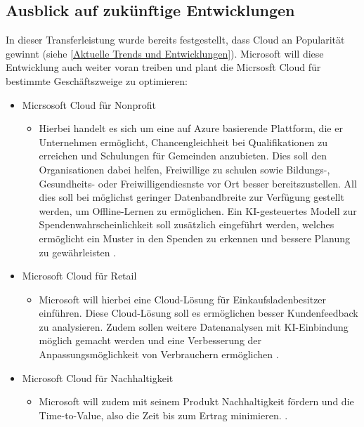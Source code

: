 \documentclass[12pt,bibtotoc]{article}
\begin{document}
		\subsection{Ausblick auf zukünftige Entwicklungen}
		In dieser Transferleistung wurde bereits festgestellt, dass Cloud an Popularität gewinnt (siehe \ref{Aktuelle Trends und Entwicklungen}).
		Microsoft will diese Entwicklung auch weiter voran treiben und plant die Micrsosft Cloud für bestimmte Geschäftszweige zu optimieren:
		\begin{itemize}
			\item Micrsosoft Cloud für Nonprofit
			\begin{itemize}
				\item Hierbei handelt es sich um eine auf Azure basierende Plattform, die er Unternehmen ermöglicht, Chancengleichheit bei Qualifikationen zu erreichen und Schulungen für Gemeinden anzubieten.
						Dies soll den Organisationen dabei helfen, Freiwillige zu schulen sowie Bildungs-, Gesundheits- oder Freiwilligendiesnste vor Ort besser bereitszustellen.
						All dies soll bei möglichst geringer Datenbandbreite zur Verfügung gestellt werden, um Offline-Lernen zu ermöglichen.
						Ein KI-gesteuertes Modell zur Spendenwahrscheinlichkeit soll zusätzlich eingeführt werden, welches ermöglicht ein Muster in den Spenden zu erkennen und bessere Planung zu gewährleisten \cite{Microsoft-Release-Plan-2024-Wave-1.2024}. 
			\end{itemize}
			\item Microsoft Cloud für Retail
				\begin{itemize}
					\item Microsoft will hierbei eine Cloud-Lösung für Einkaufsladenbesitzer einführen. Diese Cloud-Lösung soll es ermöglichen besser Kundenfeedback
							zu analysieren. Zudem sollen weitere Datenanalysen mit KI-Einbindung möglich gemacht werden und eine Verbesserung der Anpassungsmöglichkeit von Verbrauchern ermöglichen \cite{Microsoft-Release-Plan-2024-Wave-1.2024}.
				\end{itemize}
			\item Microsoft Cloud für Nachhaltigkeit
				\begin{itemize}
					\item Microsoft will zudem mit seinem Produkt Nachhaltigkeit fördern und die Time-to-Value, also die Zeit bis zum Ertrag minimieren. \cite{Microsoft-Release-Plan-2024-Wave-1.2024}.
				\end{itemize}
		\end{itemize}
\end{document}
